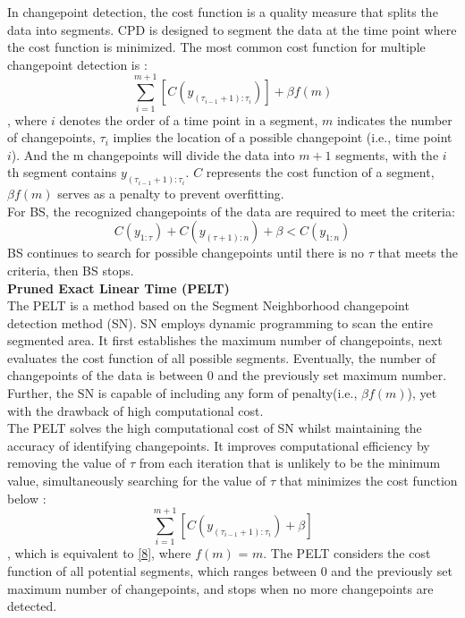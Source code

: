 \documentclass[]{interact}
\theoremstyle{plain}%
\theoremstyle{definition}
\theoremstyle{remark}
\begin{document}
In changepoint detection, the cost function is a quality measure that splits the data into segments. CPD is designed to segment the data at the time point where the cost function is minimized. The most common cost function for multiple changepoint detection is \cite{killickOptimalDetectionChangepoints2012}:
\begin{equation} \label{8}
	\sum_{i = 1} ^{m + 1} \left[C(y_{({\tau_{i-1} + 1}):\tau_{i}}) \right] + \beta f(m)
\end{equation}
, where $i$ denotes the order of a time point in a segment, $m$ indicates the number of changepoints, $\tau_i$ implies the location of a possible changepoint (i.e., time point $i$). And the m changepoints will divide the data into $m+1$ segments, with the $i$th segment contains $y_{({\tau_{i-1} + 1}):\tau_{i}}$. $C$ represents the cost function of a segment, $\beta f(m)$ serves as a penalty to prevent overfitting. \\

For BS, the recognized changepoints of the data are required to meet the criteria:
\begin{equation} \label{9}
	C(y_{1:\tau}) + C(y_{({\tau + 1}):n}) + \beta < C(y_{1:n})
\end{equation}
BS continues to search for possible changepoints until there is no $\tau$ that meets the criteria, then BS stops. \\

\hspace{-0.55cm} \textbf{Pruned Exact Linear Time (PELT)}\\

The PELT is a method based on the Segment Neighborhood changepoint detection method (SN)\cite{augerAlgorithmsOptimalIdentification1989}. SN employs dynamic programming to scan the entire segmented area. It first establishes the maximum number of changepoints, next evaluates the cost function of all possible segments. Eventually, the number of changepoints of the data is between 0 and the previously set maximum number. Further, the SN is capable of including any form of penalty(i.e., $\beta f(m)$), yet with the drawback of high computational cost. \\

The PELT solves the high computational cost of SN whilst maintaining the accuracy of identifying changepoints. It improves computational efficiency by removing the value of $\tau$ from each iteration that is unlikely to be the minimum value, simultaneously searching for the value of $\tau$ that minimizes the cost function below \cite{killickOptimalDetectionChangepoints2012}:
\begin{equation} \label{10}
	\sum_{i = 1} ^{m + 1} \left[C(y_{({\tau_{i-1} + 1}):\tau_{i}}) + \beta \right]
\end{equation}
, which is equivalent to \eqref{8}, where $f(m)$ = $m$. The PELT considers the cost function of all potential segments, which ranges between 0 and the previously set maximum number of changepoints, and stops when no more changepoints are detected.\\
\end{document}
